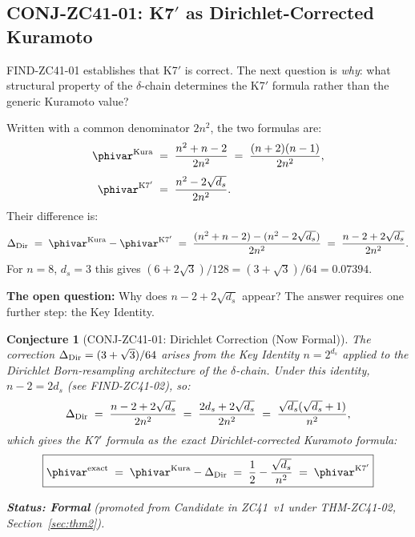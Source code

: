 \documentclass[12pt, a4paper]{article}
\newtheorem{conjecture}{Conjecture}[section]
\begin{document}
\subsection{CONJ-ZC41-01: K7\texorpdfstring{$'$}{'} as Dirichlet-Corrected Kuramoto}
\label{sec:conj}

FIND-ZC41-01 establishes that K7$'$ is correct.
The next question is \emph{why}: what structural property of the
$\delta$-chain determines the K7$'$ formula rather than the generic
Kuramoto value?

\begin{derivedbox}[title={Algebraic Decomposition: Two Numerators}]
Written with a common denominator $2n^2$, the two formulas are:
\begin{align*}
  \phivar^{\rm Kura}
  &\;=\; \frac{n^2 + n - 2}{2n^2}
   \;=\; \frac{(n+2)(n-1)}{2n^2},\\[4pt]
  \phivar^{\rm K7'}
  &\;=\; \frac{n^2 - 2\sqrt{d_s}}{2n^2}.
\end{align*}
Their difference is:
\[
  \Delta_{\rm Dir}
  \;=\; \phivar^{\rm Kura} - \phivar^{\rm K7'}
  \;=\; \frac{(n^2+n-2) - (n^2-2\sqrt{d_s})}{2n^2}
  \;=\; \frac{n - 2 + 2\sqrt{d_s}}{2n^2}.
\]
For $n = 8$, $d_s = 3$ this gives $(6 + 2\sqrt{3})/128
= (3+\sqrt{3})/64 = 0.07394$.

\medskip
\noindent\textbf{The open question:}
Why does $n - 2 + 2\sqrt{d_s}$ appear?
The answer requires one further step: the Key Identity.
\end{derivedbox}

\begin{conjecture}[CONJ-ZC41-01: Dirichlet Correction (Now Formal)]
\label{conj:dir-correction}
The correction $\Delta_{\rm Dir} = (3 + \sqrt{3})/64$
arises from the Key Identity $n = 2^{d_s}$ applied to the
Dirichlet Born-resampling architecture of the $\delta$-chain.
Under this identity, $n - 2 = 2d_s$ (see FIND-ZC41-02), so:
\[
  \Delta_{\rm Dir}
  \;=\; \frac{n - 2 + 2\sqrt{d_s}}{2n^2}
  \;=\; \frac{2d_s + 2\sqrt{d_s}}{2n^2}
  \;=\; \frac{\sqrt{d_s}(\sqrt{d_s}+1)}{n^2},
\]
which gives the K7$'$ formula as the exact Dirichlet-corrected
Kuramoto formula:
\[
  \boxed{
    \phivar^{\rm exact}
    \;=\; \phivar^{\rm Kura} - \Delta_{\rm Dir}
    \;=\; \frac{1}{2} - \frac{\sqrt{d_s}}{n^2}
    \;=\; \phivar^{\rm K7'}
  }
\]

\textbf{Status: Formal} (promoted from Candidate in ZC41~v1
under THM-ZC41-02, Section~\ref{sec:thm2}).
\end{conjecture}
\end{document}
